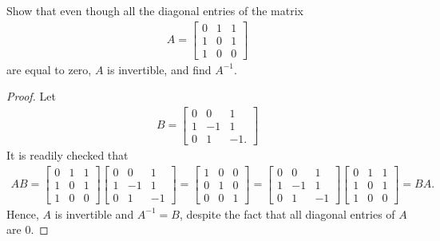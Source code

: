 \documentclass[12pt]{article}
\newenvironment{problem}[2][Problem]{\begin{trivlist} \item[\hskip \labelsep {\bfseries #1}\hskip \labelsep {\bfseries #2.}]}{\end{trivlist}}
\begin{document}
\begin{problem}{1.22}
  Show that even though all the diagonal entries of the matrix
\begin{align*}
A=
\begin{bmatrix}
  0 & 1 & 1\\ 1 & 0 & 1\\ 1 & 0 & 0
\end{bmatrix}
\end{align*}
are equal to zero, $A$ is invertible, and find $A^{-1}$. 
\begin{proof}
  Let 
\begin{align*}
  B=
\begin{bmatrix}
  0 & 0 & 1\\ 1 & -1 & 1\\ 0 & 1 & -1. 
\end{bmatrix}
\end{align*}
It is readily checked that 
\begin{align*}
  AB = 
\begin{bmatrix}
  0 & 1 & 1\\ 1 & 0 & 1\\ 1 & 0 & 0 
\end{bmatrix}
\begin{bmatrix}
  0 & 0 & 1\\ 1 & -1 & 1\\ 0 & 1 & -1 
\end{bmatrix}
= 
\begin{bmatrix}
  1 & 0 & 0\\ 0 & 1 & 0\\ 0 & 0 & 1 
\end{bmatrix}
=
\begin{bmatrix}
  0 & 0 & 1\\ 1 & -1 & 1\\ 0 & 1 & -1 
\end{bmatrix}
\begin{bmatrix}
  0 & 1 & 1\\ 1 & 0 & 1\\ 1 & 0 & 0 
\end{bmatrix}
= BA.
\end{align*}
Hence, $A$ is invertible and $A^{-1}=B$, despite the fact that all diagonal entries of $A$ are $0$. 
\end{proof}
\end{problem}
\end{document}
